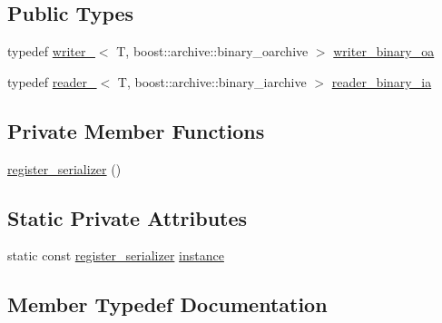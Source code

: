 \subsection*{Public Types}
\begin{DoxyCompactItemize}
\item 
typedef \hyperlink{structecto_1_1serialization_1_1writer__}{writer\+\_\+}$<$ T, boost\+::archive\+::binary\+\_\+oarchive $>$ \hyperlink{structecto_1_1serialization_1_1register__serializer_a31c9f04624076aa209e66232a511c627}{writer\+\_\+binary\+\_\+oa}
\item 
typedef \hyperlink{structecto_1_1serialization_1_1reader__}{reader\+\_\+}$<$ T, boost\+::archive\+::binary\+\_\+iarchive $>$ \hyperlink{structecto_1_1serialization_1_1register__serializer_a7783674d19bdb5a7f2143953d6a7302f}{reader\+\_\+binary\+\_\+ia}
\end{DoxyCompactItemize}
\subsection*{Private Member Functions}
\begin{DoxyCompactItemize}
\item 
\hyperlink{structecto_1_1serialization_1_1register__serializer_ae339eb881e0afbb36bff03a34263c683}{register\+\_\+serializer} ()
\end{DoxyCompactItemize}
\subsection*{Static Private Attributes}
\begin{DoxyCompactItemize}
\item 
static const \hyperlink{structecto_1_1serialization_1_1register__serializer}{register\+\_\+serializer} \hyperlink{structecto_1_1serialization_1_1register__serializer_a742ed82697621237f599631009e47e05}{instance}
\end{DoxyCompactItemize}


\subsection{Member Typedef Documentation}
